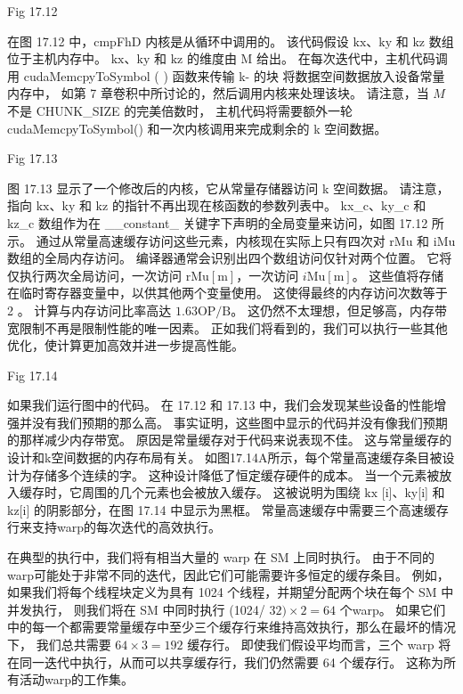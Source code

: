 {\color{red} Fig 17.12}

在图 17.12 中，cmpFhD 内核是从循环中调用的。 
该代码假设 $\mathrm{kx}、\mathrm{ky}$ 和 $\mathrm{kz}$ 数组位于主机内存中。 
$\mathrm{kx}、\mathrm{ky}$ 和 $\mathrm{kz}$ 的维度由 M 给出。
在每次迭代中，主机代码调用 cudaMemcpyToSymbol ( ) 函数来传输 k- 的块 将数据空间数据放入设备常量内存中，
如第 7 章卷积中所讨论的，然后调用内核来处理该块。 
请注意，当 $M$ 不是 CHUNK\_SIZE 的完美倍数时，
主机代码将需要额外一轮 cudaMemcpyToSymbol() 和一次内核调用来完成剩余的 k 空间数据。

{\color{red} Fig 17.13}

图 17.13 显示了一个修改后的内核，它从常量存储器访问 k 空间数据。 
请注意，指向 $\mathrm{kx}$、ky 和 $\mathrm{kz}$ 的指针不再出现在核函数的参数列表中。 
kx\_c、ky\_c 和 kz\_c 数组作为在 \_\_constant\_ 关键字下声明的全局变量来访问，如图 17.12 所示。 
通过从常量高速缓存访问这些元素，内核现在实际上只有四次对 rMu 和 iMu 数组的全局内存访问。 
编译器通常会识别出四个数组访问仅针对两个位置。 
它将仅执行两次全局访问，一次访问 $\mathrm{rMu}[\mathrm{m}]$，一次访问 $i \mathrm{Mu}[\mathrm{m}]$。 
这些值将存储在临时寄存器变量中，以供其他两个变量使用。 这使得最终的内存访问次数等于 2 。 
计算与内存访问比率高达 $1.63 \mathrm{OP} / \mathrm{B}$。 
这仍然不太理想，但足够高，内存带宽限制不再是限制性能的唯一因素。 
正如我们将看到的，我们可以执行一些其他优化，使计算更加高效并进一步提高性能。

{\color{red} Fig 17.14}

如果我们运行图中的代码。 在 17.12 和 17.13 中，我们会发现某些设备的性能增强并没有我们预期的那么高。 
事实证明，这些图中显示的代码并没有像我们预期的那样减少内存带宽。 原因是常量缓存对于代码来说表现不佳。 
这与常量缓存的设计和k空间数据的内存布局有关。 如图17.14A所示，每个常量高速缓存条目被设计为存储多个连续的字。 
这种设计降低了恒定缓存硬件的成本。 当一个元素被放入缓存时，它周围的几个元素也会被放入缓存。 
这被说明为围绕 $\mathrm{kx}$ [i]、ky[i] 和 kz[i] 的阴影部分，在图 17.14 中显示为黑框。 
常量高速缓存中需要三个高速缓存行来支持warp的每次迭代的高效执行。

在典型的执行中，我们将有相当大量的 warp 在 SM 上同时执行。 
由于不同的warp可能处于非常不同的迭代，因此它们可能需要许多恒定的缓存条目。 
例如，如果我们将每个线程块定义为具有 1024 个线程，并期望分配两个块在每个 SM 中并发执行，
则我们将在 SM 中同时执行 (1024/ $32) \times 2=64$ 个warp。 
如果它们中的每一个都需要常量缓存中至少三个缓存行来维持高效执行，那么在最坏的情况下，
我们总共需要 $64 \times 3=192$ 缓存行。 
即使我们假设平均而言，三个 warp 将在同一迭代中执行，从而可以共享缓存行，我们仍然需要 64 个缓存行。 
这称为所有活动warp的工作集。

